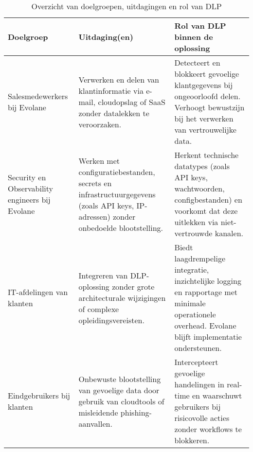 \begin{table}[h]
    \centering
    \small
    \begin{tabular}{p{4cm} p{5cm} p{6cm}}
        \toprule
        \textbf{Doelgroep} & \textbf{Uitdaging(en)} & \textbf{Rol van DLP binnen de oplossing} \\
        \midrule
        Salesmedewerkers bij Evolane 
        & Verwerken en delen van klantinformatie via e-mail, cloudopslag of SaaS zonder datalekken te veroorzaken. 
        & Detecteert en blokkeert gevoelige klantgegevens bij ongeoorloofd delen. Verhoogt bewustzijn bij het verwerken van vertrouwelijke data. \\

        Security en Observability engineers bij Evolane 
        & Werken met configuratiebestanden, secrets en infrastructuurgegevens (zoals API keys, IP-adressen) zonder onbedoelde blootstelling.
        & Herkent technische datatypes (zoals API keys, wachtwoorden, configbestanden) en voorkomt dat deze uitlekken via niet-vertrouwde kanalen. \\

        IT-afdelingen van klanten 
        & Integreren van DLP-oplossing zonder grote architecturale wijzigingen of complexe opleidingsvereisten. 
        & Biedt laagdrempelige integratie, inzichtelijke logging en rapportage met minimale operationele overhead. Evolane blijft implementatie ondersteunen. \\

        Eindgebruikers bij klanten 
        & Onbewuste blootstelling van gevoelige data door gebruik van cloudtools of misleidende phishing-aanvallen. 
        & Intercepteert gevoelige handelingen in real-time en waarschuwt gebruikers bij risicovolle acties zonder workflows te blokkeren. \\
        \bottomrule
    \end{tabular}
    \caption{Overzicht van doelgroepen, uitdagingen en rol van DLP}
    \label{tab:probleemstelling}
\end{table}


